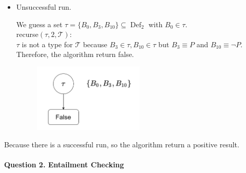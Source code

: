 \documentclass[12pt]{article}
\begin{document}
\begin{itemize}
\begin{figure}[htbp]
        \end{figure} \par
        \item Unsuccessful run. \par
        We guess a set $\tau = \{ B_0,B_3,  B_{10} \} \subseteq \operatorname{Def}_2$ with $B_0 \in \tau$. \\
        recurse$(\tau, 2, \mathcal{T})$: \\
        $\tau$ is not a type for $\mathcal{T}$ because $B_3 \in \tau, B_{10} \in \tau$ but $B_3 \equiv P$ and $B_{10} \equiv \lnot P$.
        Therefore, the algorithm return false.
        \newpage
        \begin{figure}[htbp]
            \centering 
            \includegraphics[width=0.5\textwidth,height=0.3\textwidth]{aaa.png}
        \end{figure} \par
    \end{itemize}
    Because there is a successful run, so the algorithm return a positive result.

    \newpage
    \paragraph{Question 2. Entailment Checking}~{}
    \\
\end{document}
